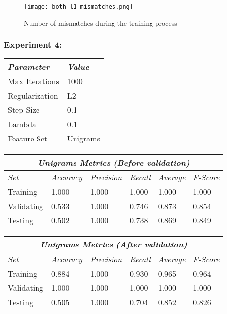 \documentclass[11pt]{article}
\begin{document}
\begin{figure}[H]
  \caption{Number of mismatches during the training process}
  \texttt{[image: both-l1-mismatches.png]}
  \centering
\end{figure}



\clearpage
\subsubsection*{Experiment 4:}

\begin{table}[H]
\centering
\begin{tabular}{ |p{3cm}||p{2cm}|  }
 \hline
 \textit{Parameter} & \textit{Value} \\
 \hline
 Max Iterations   & 1000 \\
 Regularization & L2 \\
 Step Size    & 0.1 \\
 Lambda    & 0.1 \\
 Feature Set    & Unigrams \\
 \hline
\end{tabular}
\end{table}

\begin{table}[H]
\centering
\begin{tabular}{ |p{2cm}||p{2cm}|p{2cm}|p{2cm}|p{2cm}|p{2cm}|  }
 \hline
 \multicolumn{6}{|c|}{\textbf{\textit{Unigrams Metrics (Before validation)}}} \\
 \hline
 \textit{Set} & \textit{Accuracy} & \textit{Precision} & \textit{Recall} & \textit{Average} & \textit{F-Score} \\
 \hline
 Training   & 1.000 & 1.000 & 1.000 & 1.000 & 1.000 \\
 Validating & 0.533 & 1.000 & 0.746 & 0.873 & 0.854 \\
 Testing    & 0.502 & 1.000 & 0.738 & 0.869 & 0.849 \\
 \hline
\end{tabular}
\end{table}

\begin{table}[H]
\centering
\begin{tabular}{ |p{2cm}||p{2cm}|p{2cm}|p{2cm}|p{2cm}|p{2cm}|  }
 \hline
 \multicolumn{6}{|c|}{\textbf{\textit{Unigrams Metrics (After validation)}}} \\
 \hline
 \textit{Set} & \textit{Accuracy} & \textit{Precision} & \textit{Recall} & \textit{Average} & \textit{F-Score} \\
 \hline
 Training   & 0.884 & 1.000 & 0.930 & 0.965 & 0.964 \\
 Validating & 1.000 & 1.000 & 1.000 & 1.000 & 1.000 \\
 Testing    & 0.505 & 1.000 & 0.704 & 0.852 & 0.826 \\
 \hline
\end{tabular}
\end{table}
\end{document}
